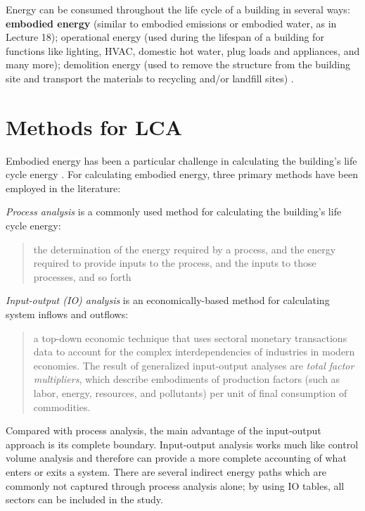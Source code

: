 \documentclass[10pt]{article}
\begin{document}
 Energy can be consumed throughout the life cycle of a building in several ways:  \textbf{embodied energy} (similar to embodied emissions or embodied water, as in Lecture 18); operational energy (used during the lifespan of a building for functions like lighting, HVAC, domestic hot water, plug loads and appliances, and many more); demolition energy (used to remove the structure from the building site and transport the materials to recycling and/or landfill sites) \cite{cabeza2014life}.
 
\section{Methods for LCA} %

Embodied energy has been a particular challenge in calculating the building's life cycle energy \cite{dixit2010identification}. For calculating embodied energy, three primary methods have been employed in the literature:

\textit{Process analysis} is a commonly used method for calculating the building's life cycle energy:

\begin{quote}
    the determination of the energy required by a process, and the energy required to  provide inputs to the process, and the inputs to those processes, and so forth \cite{treloar1998comprehensive}
\end{quote}


\textit{Input-output (IO) analysis} is an economically-based method for calculating system inflows and outflows:

\begin{quote}
    a  top-down economic technique that uses sectoral monetary
transactions data to account for the complex interdependencies of industries in modern economies. The result of generalized input-output analyses are \textit{total factor multipliers}, which describe embodiments of production factors (such
as labor, energy, resources, and pollutants) per unit of final consumption of commodities. \cite{Lenzen2000-vu}
\end{quote}


Compared with process analysis, the main advantage of the input-output approach is its complete boundary. Input-output analysis works much like control volume analysis and therefore can provide a more complete accounting of what enters or exits a system. There are several indirect energy paths which are commonly not captured through process analysis alone; by using IO tables, all sectors can be included in the study. 
\end{document}
